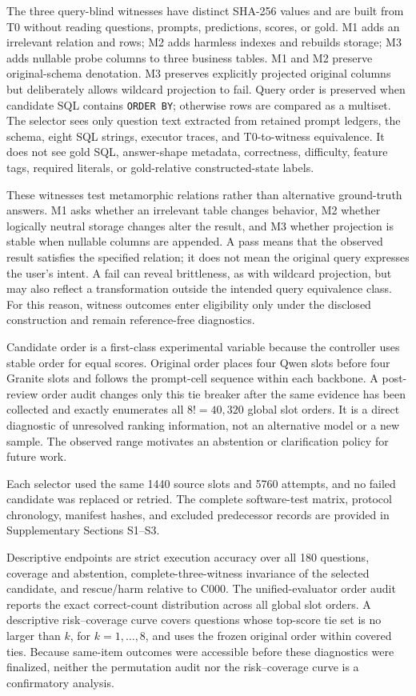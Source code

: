 \documentclass[applsci,article,submit,moreauthors]{Definitions/mdpi}
\begin{document}
The three query-blind witnesses have distinct SHA-256 values and are built from T0 without reading questions, prompts, predictions, scores, or gold. M1 adds an irrelevant relation and rows; M2 adds harmless indexes and rebuilds storage; M3 adds nullable probe columns to three business tables. M1 and M2 preserve original-schema denotation. M3 preserves explicitly projected original columns but deliberately allows wildcard projection to fail. Query order is preserved when candidate SQL contains \texttt{ORDER BY}; otherwise rows are compared as a multiset. The selector sees only question text extracted from retained prompt ledgers, the schema, eight SQL strings, executor traces, and T0-to-witness equivalence. It does not see gold SQL, answer-shape metadata, correctness, difficulty, feature tags, required literals, or gold-relative constructed-state labels.

These witnesses test metamorphic relations rather than alternative ground-truth answers. M1 asks whether an irrelevant table changes behavior, M2 whether logically neutral storage changes alter the result, and M3 whether projection is stable when nullable columns are appended. A pass means that the observed result satisfies the specified relation; it does not mean the original query expresses the user's intent. A fail can reveal brittleness, as with wildcard projection, but may also reflect a transformation outside the intended query equivalence class. For this reason, witness outcomes enter eligibility only under the disclosed construction and remain reference-free diagnostics.

Candidate order is a first-class experimental variable because the controller uses stable order for equal scores. Original order places four Qwen slots before four Granite slots and follows the prompt-cell sequence within each backbone. A post-review order audit changes only this tie breaker after the same evidence has been collected and exactly enumerates all $8!=40{,}320$ global slot orders. It is a direct diagnostic of unresolved ranking information, not an alternative model or a new sample. The observed range motivates an abstention or clarification policy for future work.

Each selector used the same 1440 source slots and 5760 attempts, and no failed candidate was replaced or retried. The complete software-test matrix, protocol chronology, manifest hashes, and excluded predecessor records are provided in Supplementary Sections S1--S3.

Descriptive endpoints are strict execution accuracy over all 180 questions, coverage and abstention, complete-three-witness invariance of the selected candidate, and rescue/harm relative to C000. The unified-evaluator order audit reports the exact correct-count distribution across all global slot orders. A descriptive risk--coverage curve covers questions whose top-score tie set is no larger than $k$, for $k=1,\ldots,8$, and uses the frozen original order within covered ties. Because same-item outcomes were accessible before these diagnostics were finalized, neither the permutation audit nor the risk--coverage curve is a confirmatory analysis.
\end{document}
